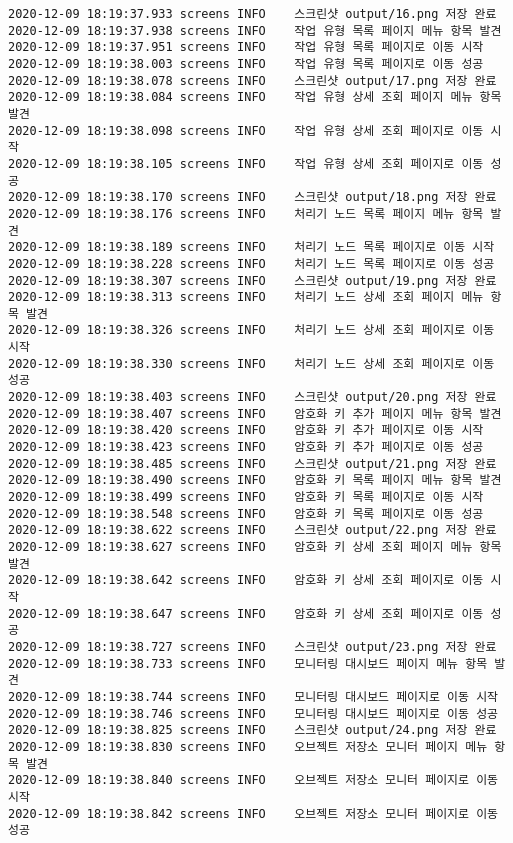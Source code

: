 \begin{Verbatim}[fontsize=\tiny, breaklines=true, breakanywhere=true]
2020-12-09 18:19:37.933 screens	INFO	스크린샷 output/16.png 저장 완료
2020-12-09 18:19:37.938 screens	INFO	작업 유형 목록 페이지 메뉴 항목 발견
2020-12-09 18:19:37.951 screens	INFO	작업 유형 목록 페이지로 이동 시작
2020-12-09 18:19:38.003 screens	INFO	작업 유형 목록 페이지로 이동 성공
2020-12-09 18:19:38.078 screens	INFO	스크린샷 output/17.png 저장 완료
2020-12-09 18:19:38.084 screens	INFO	작업 유형 상세 조회 페이지 메뉴 항목 발견
2020-12-09 18:19:38.098 screens	INFO	작업 유형 상세 조회 페이지로 이동 시작
2020-12-09 18:19:38.105 screens	INFO	작업 유형 상세 조회 페이지로 이동 성공
2020-12-09 18:19:38.170 screens	INFO	스크린샷 output/18.png 저장 완료
2020-12-09 18:19:38.176 screens	INFO	처리기 노드 목록 페이지 메뉴 항목 발견
2020-12-09 18:19:38.189 screens	INFO	처리기 노드 목록 페이지로 이동 시작
2020-12-09 18:19:38.228 screens	INFO	처리기 노드 목록 페이지로 이동 성공
2020-12-09 18:19:38.307 screens	INFO	스크린샷 output/19.png 저장 완료
2020-12-09 18:19:38.313 screens	INFO	처리기 노드 상세 조회 페이지 메뉴 항목 발견
2020-12-09 18:19:38.326 screens	INFO	처리기 노드 상세 조회 페이지로 이동 시작
2020-12-09 18:19:38.330 screens	INFO	처리기 노드 상세 조회 페이지로 이동 성공
2020-12-09 18:19:38.403 screens	INFO	스크린샷 output/20.png 저장 완료
2020-12-09 18:19:38.407 screens	INFO	암호화 키 추가 페이지 메뉴 항목 발견
2020-12-09 18:19:38.420 screens	INFO	암호화 키 추가 페이지로 이동 시작
2020-12-09 18:19:38.423 screens	INFO	암호화 키 추가 페이지로 이동 성공
2020-12-09 18:19:38.485 screens	INFO	스크린샷 output/21.png 저장 완료
2020-12-09 18:19:38.490 screens	INFO	암호화 키 목록 페이지 메뉴 항목 발견
2020-12-09 18:19:38.499 screens	INFO	암호화 키 목록 페이지로 이동 시작
2020-12-09 18:19:38.548 screens	INFO	암호화 키 목록 페이지로 이동 성공
2020-12-09 18:19:38.622 screens	INFO	스크린샷 output/22.png 저장 완료
2020-12-09 18:19:38.627 screens	INFO	암호화 키 상세 조회 페이지 메뉴 항목 발견
2020-12-09 18:19:38.642 screens	INFO	암호화 키 상세 조회 페이지로 이동 시작
2020-12-09 18:19:38.647 screens	INFO	암호화 키 상세 조회 페이지로 이동 성공
2020-12-09 18:19:38.727 screens	INFO	스크린샷 output/23.png 저장 완료
2020-12-09 18:19:38.733 screens	INFO	모니터링 대시보드 페이지 메뉴 항목 발견
2020-12-09 18:19:38.744 screens	INFO	모니터링 대시보드 페이지로 이동 시작
2020-12-09 18:19:38.746 screens	INFO	모니터링 대시보드 페이지로 이동 성공
2020-12-09 18:19:38.825 screens	INFO	스크린샷 output/24.png 저장 완료
2020-12-09 18:19:38.830 screens	INFO	오브젝트 저장소 모니터 페이지 메뉴 항목 발견
2020-12-09 18:19:38.840 screens	INFO	오브젝트 저장소 모니터 페이지로 이동 시작
2020-12-09 18:19:38.842 screens	INFO	오브젝트 저장소 모니터 페이지로 이동 성공

\end{Verbatim}
